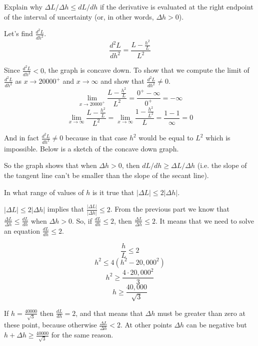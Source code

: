\documentclass{article}
\begin{document}
\begin{tcolorbox}
    Explain why \( \Delta L/\Delta h \leq dL/dh \) if the derivative is evaluated at the right endpoint of the interval of uncertainty (or, in other words, \( \Delta h > 0 \)).
\end{tcolorbox}
Let's find \( \frac{d^2L}{dh^2} \). 
\[ \frac{d^2L}{dh^2} = \frac{L - \frac{h^2}{L}}{L^2} \]
\par Since \( \frac{d^2L}{dh^2} < 0\), the graph is concave down. To show that we compute the limit of $\frac{d^2L}{dh^2}$ as $x \to 20000^+$ and $x \to \infty$ and show that $\frac{d^2L}{dh^2} \neq 0$. 
\[ \lim_{x \to 20000^+} \frac{L - \frac{h^2}{L}}{L^2} = \frac{0^+ - \infty}{0^+} = -\infty \]
\[ \lim_{x \to \infty} \frac{L - \frac{h^2}{L}}{L^2} = \lim_{x \to \infty} \frac{1 - \frac{h^2}{L^2}}{L} = \frac{1-1}{\infty} = 0 \]
\par And in fact $\frac{d^2L}{dh^2} \neq 0$ because in that case $h^2$ would be equal to $L^2$ which is impossible. Below is a sketch of the concave down graph.
\begin{figure}[htp!]
    \centering
    
    \label{fig:fig9}
\end{figure}
\par So the graph shows that when $\Delta h > 0$, then $dL/dh \geq \Delta L / \Delta h$ (i.e. the slope of the tangent line can't be smaller than the slope of the secant line).

\begin{tcolorbox}
    In what range of values of $h$ is it true that $|\Delta L| \leq 2|\Delta h|$.
\end{tcolorbox}

$|\Delta L| \leq 2|\Delta h|$ implies that $\frac{|\Delta L|}{|\Delta h|} \leq 2$. From the previous part we know that $\frac{\Delta L}{\Delta h} \leq \frac{dL}{dh}$ when $\Delta h > 0$. So, if $\frac{dL}{dh} \leq 2$, then $\frac{\Delta L}{\Delta h} \leq 2$. It means that we need to solve an equation $\frac{dL}{dh} \leq 2$.

\[ \frac{h}{L} \leq 2 \]
\[ h^2 \leq 4(h^2-20,000^2) \]
\[ h^2 \geq \frac{4\cdot20,000^2}{3} \]
\[ h \geq \frac{40,000}{\sqrt{3}} \]

\par If $h = \frac{40000}{\sqrt{3}}$ then $\frac{dL}{dh} = 2$, and that means that $\Delta h$ must be greater than zero at these point, because otherwise $\frac{\Delta L}{\Delta h} < 2$. At other points $\Delta h$ can be negative but $h + \Delta h \geq \frac{40000}{\sqrt{3}}$ for the same reason. 
\end{document}
